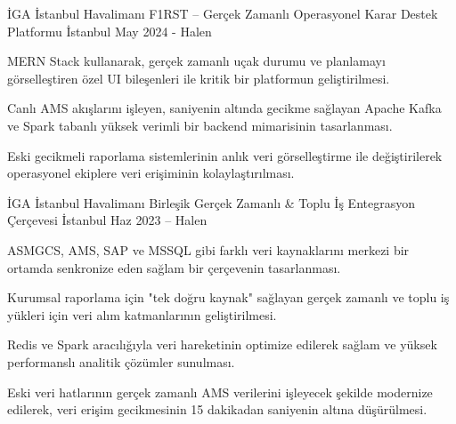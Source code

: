 
\begin{cventries}

\cventry
  {İGA İstanbul Havalimanı}
  {F1RST – Gerçek Zamanlı Operasyonel Karar Destek Platformu}
  {İstanbul}
  {May 2024 - Halen}
  {
    \begin{cvitems}
      \item {MERN Stack kullanarak, gerçek zamanlı uçak durumu ve planlamayı görselleştiren özel UI bileşenleri ile kritik bir platformun geliştirilmesi.}
      \item {Canlı AMS akışlarını işleyen, saniyenin altında gecikme sağlayan Apache Kafka ve Spark tabanlı yüksek verimli bir backend mimarisinin tasarlanması.}
      \item {Eski gecikmeli raporlama sistemlerinin anlık veri görselleştirme ile değiştirilerek operasyonel ekiplere veri erişiminin kolaylaştırılması.}
    \end{cvitems}
  }
    \cventry
    {İGA İstanbul Havalimanı}
    {Birleşik Gerçek Zamanlı \& Toplu İş Entegrasyon Çerçevesi}
    {İstanbul}
    {Haz 2023 – Halen}
    {
      \begin{cvitems}
        \item {ASMGCS, AMS, SAP ve MSSQL gibi farklı veri kaynaklarını merkezi bir ortamda senkronize eden sağlam bir çerçevenin tasarlanması.}
        \item {Kurumsal raporlama için "tek doğru kaynak" sağlayan gerçek zamanlı ve toplu iş yükleri için veri alım katmanlarının geliştirilmesi.}
        \item {Redis ve Spark aracılığıyla veri hareketinin optimize edilerek sağlam ve yüksek performanslı analitik çözümler sunulması.}
        \item {Eski veri hatlarının gerçek zamanlı AMS verilerini işleyecek şekilde modernize edilerek, veri erişim gecikmesinin 15 dakikadan saniyenin altına düşürülmesi.}
      \end{cvitems}
    }


\end{cventries}
